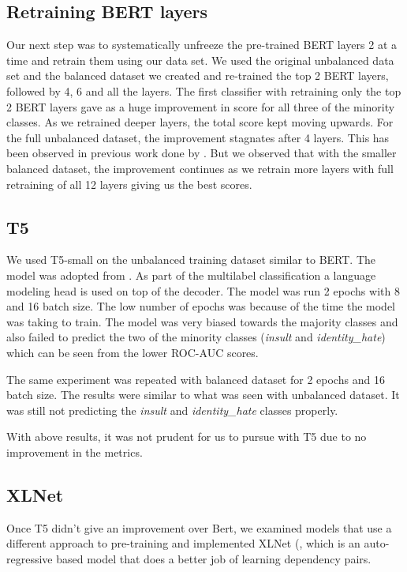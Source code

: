 \documentclass[11pt,a4paper]{article}
\begin{document}
\subsection{Retraining BERT layers}
Our next step was to systematically unfreeze the pre-trained BERT layers 2 at a time and retrain them using our data set. We used the original unbalanced data set and the balanced dataset we created and re-trained the top 2 BERT layers, followed by 4, 6 and all the layers.
The first classifier with retraining only the top 2 BERT layers gave as a huge improvement in score for all three of the minority classes. As we retrained deeper layers, the total score kept moving upwards. For the full unbalanced dataset, the improvement stagnates after 4 layers. This has been observed in previous work done by \cite{Singh2020HowMD}. But we observed that with the smaller balanced dataset, the improvement continues as we retrain more layers with full retraining of all 12 layers giving us the best scores.


\subsection{T5}
We used T5-small \cite{raffel2020exploring} on the unbalanced training dataset similar to BERT. The model was adopted from \cite{t5mlcode}. As part of the multilabel classification a language modeling head is used on top of the decoder. The model was run 2 epochs with 8 and 16 batch size. The low number of epochs was because of the time the model was taking to train. The model was very biased towards the majority classes and also failed to predict the two of the minority classes (\emph{insult} and \emph{identity\_hate}) which can be seen from the lower ROC-AUC scores.

The same experiment was repeated with balanced dataset for 2 epochs and 16 batch size. The results were similar to what was seen with unbalanced dataset. It was still not predicting the \emph{insult} and \emph{identity\_hate} classes properly.

With above results, it was not prudent for us to pursue with T5 due to no improvement in the metrics.

\subsection{XLNet}

Once T5 didn't give an improvement over Bert, we examined models that use a different approach to pre-training and implemented XLNet (\cite{yang2019xlnet}, which is an auto-regressive based model that does a better job of learning dependency pairs.
\end{document}
